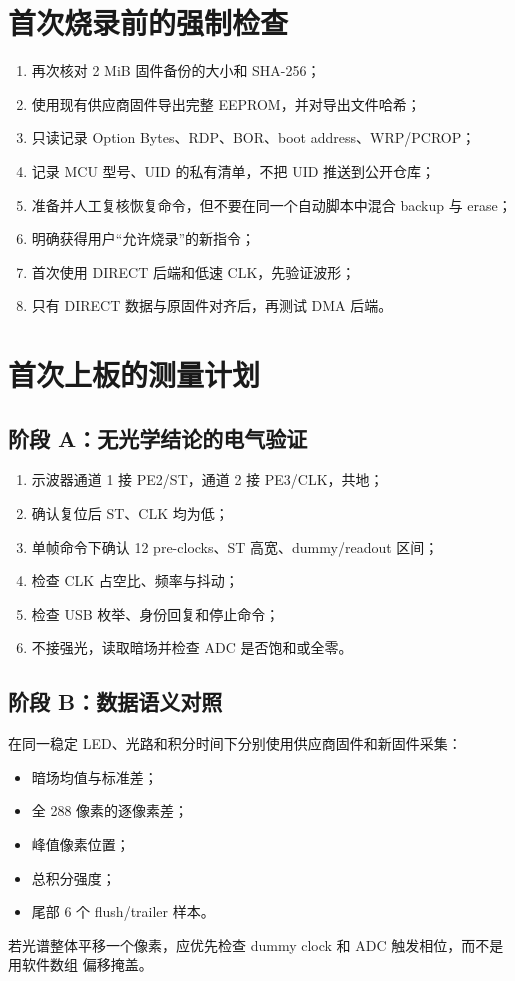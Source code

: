 \documentclass[UTF8,fontset=windows,11pt]{ctexart}
\begin{document}
\section{首次烧录前的强制检查}

\begin{enumerate}
  \item 再次核对 2 MiB 固件备份的大小和 SHA-256；
  \item 使用现有供应商固件导出完整 EEPROM，并对导出文件哈希；
  \item 只读记录 Option Bytes、RDP、BOR、boot address、WRP/PCROP；
  \item 记录 MCU 型号、UID 的私有清单，不把 UID 推送到公开仓库；
  \item 准备并人工复核恢复命令，但不要在同一个自动脚本中混合 backup 与 erase；
  \item 明确获得用户“允许烧录”的新指令；
  \item 首次使用 DIRECT 后端和低速 CLK，先验证波形；
  \item 只有 DIRECT 数据与原固件对齐后，再测试 DMA 后端。
\end{enumerate}

\section{首次上板的测量计划}

\subsection{阶段 A：无光学结论的电气验证}

\begin{enumerate}
  \item 示波器通道 1 接 PE2/ST，通道 2 接 PE3/CLK，共地；
  \item 确认复位后 ST、CLK 均为低；
  \item 单帧命令下确认 12 pre-clocks、ST 高宽、dummy/readout 区间；
  \item 检查 CLK 占空比、频率与抖动；
  \item 检查 USB 枚举、身份回复和停止命令；
  \item 不接强光，读取暗场并检查 ADC 是否饱和或全零。
\end{enumerate}

\subsection{阶段 B：数据语义对照}

在同一稳定 LED、光路和积分时间下分别使用供应商固件和新固件采集：
\begin{itemize}
  \item 暗场均值与标准差；
  \item 全 288 像素的逐像素差；
  \item 峰值像素位置；
  \item 总积分强度；
  \item 尾部 6 个 flush/trailer 样本。
\end{itemize}
若光谱整体平移一个像素，应优先检查 dummy clock 和 ADC 触发相位，而不是用软件数组
偏移掩盖。
\end{document}
